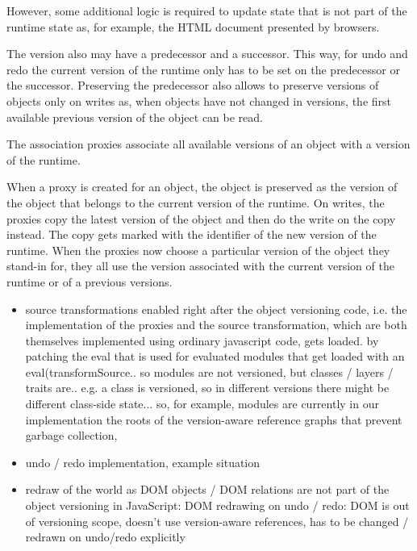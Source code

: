 However, some additional logic is required to update state that is not part of the runtime state as, for example, the HTML document presented by browsers.


The version also may have a predecessor and a successor.
This way, for undo and redo the current version of the runtime only has to be set on the predecessor or the successor.
Preserving the predecessor also allows to preserve versions of objects only on writes as, when objects have not changed in versions, the first available previous version of the object can be read.


The association proxies associate all available versions of an object with a version of the runtime.


When a proxy is created for an object, the object is preserved as the version of the object that belongs to the current version of the runtime.
On writes, the proxies copy the latest version of the object and then do the write on the copy instead.
The copy gets marked with the identifier of the new version of the runtime.
When the proxies now choose a particular version of the object they stand-in for, they all use the version associated with the current version of the runtime or of a previous versions.


\begin{itemize}
    \item source transformations enabled right after the object versioning code, i.e. the implementation of the proxies and the source transformation, which are both themselves implemented using ordinary javascript code, gets loaded. by patching the eval that is used for evaluated modules that get loaded with an eval(transformSource.. so modules are not versioned, but classes / layers / traits are.. e.g. a class is versioned, so in different versions there might be different class-side state... so, for example, modules are currently in our implementation the roots of the version-aware reference graphs that prevent garbage collection, 
\end{itemize}


\begin{itemize}
    \item undo / redo implementation, example situation
    \item redraw of the world as DOM objects / DOM relations are not part of the object versioning in JavaScript: DOM redrawing on undo / redo: DOM is out of versioning scope, doesn’t use version-aware references, has to be changed / redrawn on undo/redo explicitly
    
\end{itemize}









